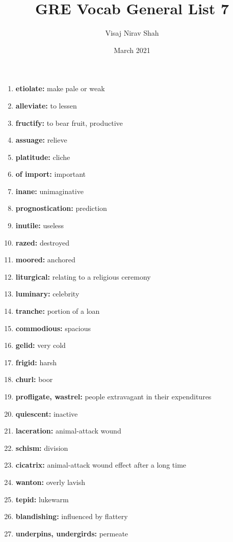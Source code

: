 \documentclass{article}
\title{\textbf{GRE Vocab General List 7}}
\author{Visaj Nirav Shah}
\date{March 2021}
\begin{document}
\maketitle

\begin{enumerate}
    \item \textbf{etiolate: }{make pale or weak}
    \item \textbf{alleviate: }{to lessen}
    \item \textbf{fructify: }{to bear fruit, productive}
    \item \textbf{assuage: }{relieve}
    \item \textbf{platitude: }{cliche}
    \item \textbf{of import: }{important}
    \item \textbf{inane: }{unimaginative}
    \item \textbf{prognostication: }{prediction}
    \item \textbf{inutile: }{useless}
    \item \textbf{razed: }{destroyed}
    \item \textbf{moored: }{anchored}
    \item \textbf{liturgical: }{relating to a religious ceremony}
    \item \textbf{luminary: }{celebrity}
    \item \textbf{tranche: }{portion of a loan}
    \item \textbf{commodious: }{spacious}
    \item \textbf{gelid: }{very cold}
    \item \textbf{frigid: }{harsh}
    \item \textbf{churl: }{boor}
    \item \textbf{profligate, wastrel: }{people extravagant in their expenditures}
    \item \textbf{quiescent: }{inactive}
    \item \textbf{laceration: }{animal-attack wound}
    \item \textbf{schism: }{division}
    \item \textbf{cicatrix: }{animal-attack wound effect after a long time}
    \item \textbf{wanton: }{overly lavish}
    \item \textbf{tepid: }{lukewarm}
    \item \textbf{blandishing: }{influenced by flattery}
    \item \textbf{underpins, undergirds: }{permeate}

\end{enumerate}
\end{document}
